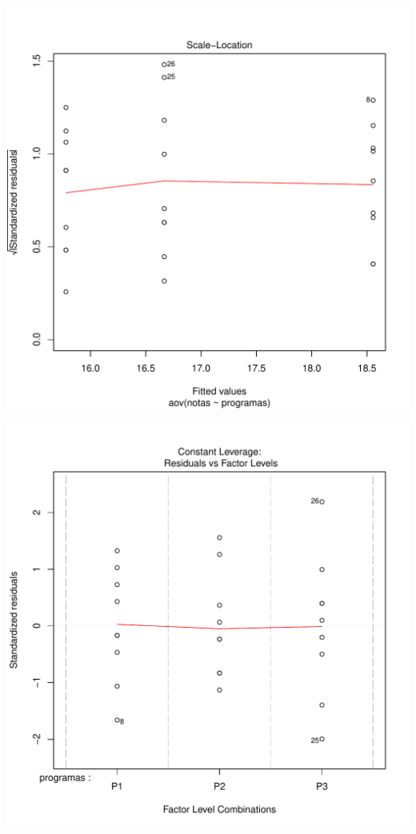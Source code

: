 \documentclass[12pt,letterpaper]{article}\usepackage[]{graphicx}\usepackage[]{color}
\makeatletter
\def\maxwidth{ %
  \ifdim\Gin@nat@width>\linewidth
    \linewidth
  \else
    \Gin@nat@width
  \fi
}
\newenvironment{knitrout}{}{} %
\makeatother
\begin{document}
\begin{itemize}
\begin{knitrout}
\includegraphics[width=\maxwidth]{figure/unnamed-chunk-2-3} 

\includegraphics[width=\maxwidth]{figure/unnamed-chunk-2-4} 


\end{knitrout}
\end{itemize}
\end{document}
